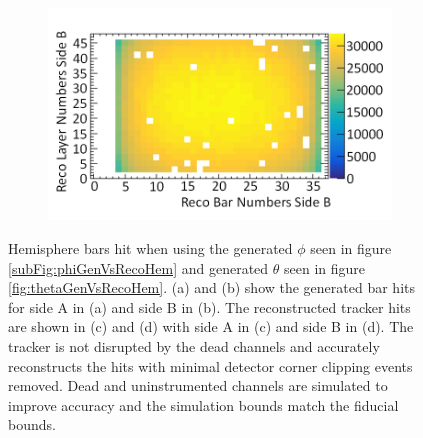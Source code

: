 \begin{figure}[!h]
\begin{subfigure}{.5\textwidth}
  \captionsetup{width=.9\linewidth}
  \caption{}
  \label{subFig:hemisphereFiducialBarsSideA}
\end{subfigure}%
\begin{subfigure}{.5\textwidth}
  \centering
\includegraphics[width=\linewidth]{Chapter6/Figs/Raster/hemisphereFiducialBarsSideBMedText.png}
  \captionsetup{width=.9\linewidth}
  \caption{}
  \label{subFig:hemisphereFiducialBarsSideB}
\end{subfigure}
\caption[Hemisphere bars hit when using the generated $\phi$ and $\theta$ from CRY figure.]{Hemisphere bars hit when using the generated $\phi$ seen in figure \ref{subFig:phiGenVsRecoHem} and generated $\theta$ seen in figure \ref{fig:thetaGenVsRecoHem}. (a) and (b) show the generated bar hits for side A in (a) and side B in (b). The reconstructed tracker hits are shown in (c) and (d) with side A in (c) and side B in (d). The tracker is not disrupted by the dead channels and accurately reconstructs the hits with minimal detector corner clipping events removed. Dead and uninstrumented channels are simulated to improve accuracy and the simulation bounds match the fiducial bounds.}
\label{fig:HemisphereFiducialBarsSideAB}
\end{figure}

